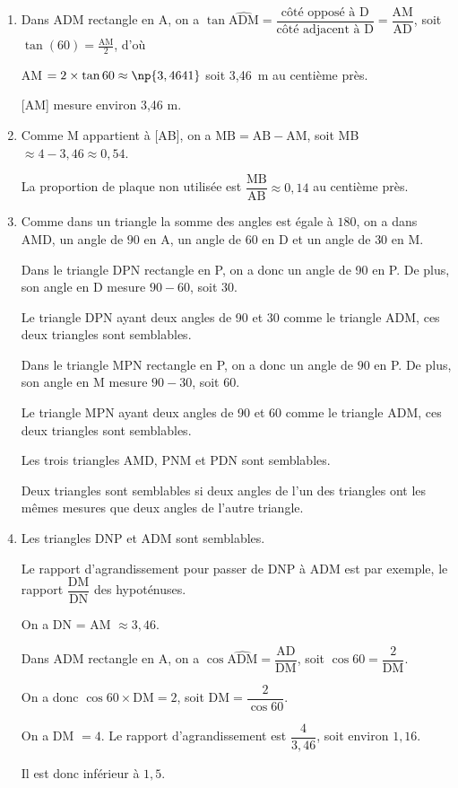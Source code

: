 \medskip

\begin{enumerate}
\item Dans ADM rectangle en A, on a  $\tan \widehat{\text{ADM}} = \dfrac{\text{côté opposé à D}}{\text{côté adjacent à D}} = \dfrac{\text{AM}}{\text{AD}}$, soit $\tan (60) = \frac{\text{AM}}{2}$, d'où

AM $= 2 \times \tan 60 \approx \np{3,4641}$ soit 3,46~m au centième près.
 
[AM] mesure environ 3,46 m. 
\item  Comme M appartient à  [AB], on a $\text{MB} = \text{AB} - \text{AM}$, 
soit MB $\approx 4 - 3,46 \approx  0,54$.

La proportion de plaque non utilisée est  $\dfrac{\text{MB}}{\text{AB}} \approx  0,14$ au centième près.
\item  Comme dans un triangle la somme des angles est égale à $180$\degres{},
on a dans AMD, un angle de $90$\degres{} en A, un angle de $60$\degres{} en D et un angle de $30$\degres{} en M.

Dans le triangle DPN rectangle en P, on a donc un angle de 90\degres{} en P.
De plus, son angle en D mesure $90 - 60$, soit $30$\degres{}.

Le triangle DPN ayant deux angles de 90\degres{} et 30\degres{} comme le triangle ADM, ces deux triangles sont semblables.

Dans le triangle MPN rectangle en P, on a donc un angle de $90$\degres{} en P.
De plus, son angle en M mesure $90 - 30$, soit $60$\degres{}.

Le triangle MPN ayant deux angles de 90\degres{} et 60\degres{} comme le triangle ADM, ces deux triangles sont semblables.

Les trois triangles AMD, PNM et PDN sont semblables.
 
Deux triangles sont semblables si deux angles de l'un des triangles ont les mêmes mesures que deux angles de l'autre triangle.
\item  Les triangles DNP et ADM sont semblables.

Le rapport d'agrandissement pour passer de DNP à ADM est par exemple, le rapport $\dfrac{\text{DM}}{\text{DN}}$ des hypoténuses.

On a DN = AM $\approx 3,46$.

Dans ADM rectangle en A, on a  $\cos \widehat{\text{ADM}} = \dfrac{\text{AD}}{\text{DM}}$, soit $\cos 60 = \dfrac{2}{\text{DM}}$.

On a donc $\cos 60 \times \text{DM} = 2$, soit $\text{DM} = \dfrac{2}{\cos 60}$.

On a DM $= 4$.
Le rapport d'agrandissement est $\dfrac{4}{3,46}$, soit environ $1,16$.

Il est donc  inférieur à $1,5$.
\end{enumerate}

\bigskip
